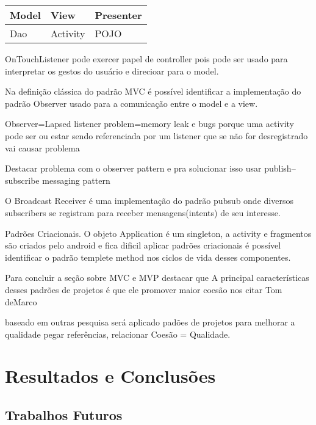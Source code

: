 \documentclass[
	12pt,				%
	openright,			%
	twoside,			%
	a4paper,			%
	english,			%
	french,				%
	spanish,			%
	brazil,				%
	]{abntex2}
\begin{document}
\begin{center}
\begin{tabular}{ | l | l | l | }
  \hline                        
  	Model & View & Presenter \\  \hline
  	Dao & Activity & POJO \\  \hline
\end{tabular}
\end{center}

OnTouchListener pode exercer papel de controller pois
pode ser usado para interpretar os gestos do usuário e direcioar para o model.


Na definição clássica do padrão MVC é possível identificar a implementação do
padrão Observer usado para a comunicação entre o model e a view.

Observer=Lapsed listener problem=memory leak e bugs porque uma activity pode ser
ou estar sendo referenciada por um listener que se não for desregistrado vai
causar problema

Destacar problema com o observer pattern e pra solucionar isso
usar publish–subscribe messaging pattern

O Broadcast Receiver é uma implementação do padrão pubsub onde diversos
subscribers se registram para receber mensagens(intents) de seu interesse.


Padrões Criacionais. O objeto Application é um singleton, a activity e
fragmentos são criados pelo android e fica dificil aplicar padrões criacionais é
possível identificar o padrão templete method nos ciclos de vida desses
componentes.



 Para concluir a seção sobre MVC e MVP destacar que A principal características
 desses padrões de projetos é que ele promover maior coesão nos citar Tom deMarco 

baseado em outras pesquisa será aplicado padões de projetos  para melhorar a
 qualidade pegar referências,  relacionar Coesão = Qualidade.

\chapter{Resultados e Conclusões}



\section{Trabalhos Futuros}
\end{document}
